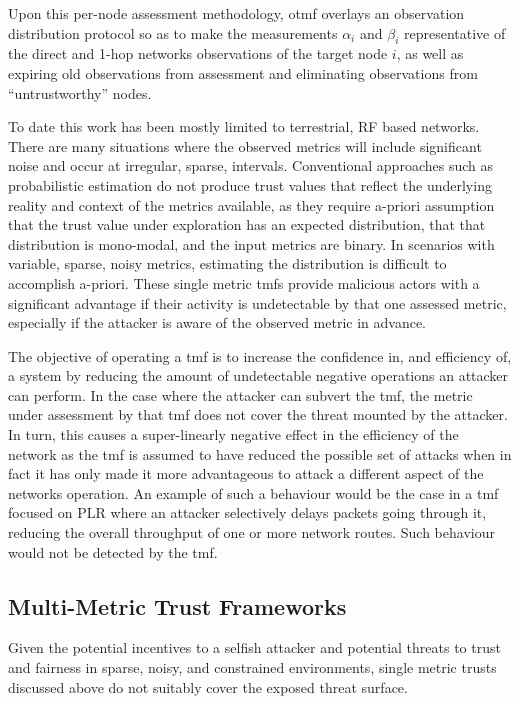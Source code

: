 Upon this per-node assessment methodology, \gls{otmf} overlays an observation distribution protocol so as to make the measurements $\alpha_i$ and $\beta_i$ representative of the direct and 1-hop networks observations of the target node $i$, as well as expiring old observations from assessment and eliminating observations from ``untrustworthy'' nodes.



To date this work has been mostly limited to terrestrial, RF based networks.
There are many situations where the observed metrics will include significant noise and occur at irregular, sparse, intervals.
Conventional approaches such as probabilistic estimation do not produce trust values that reflect the underlying reality and context of the metrics available, as they require a-priori assumption that the trust value under exploration has an expected distribution, that that distribution is mono-modal, and the input metrics are binary.
In scenarios with variable, sparse, noisy metrics, estimating the distribution is difficult to accomplish a-priori.
These single metric \glspl{tmf} provide malicious actors with a significant advantage if their activity is undetectable by that one assessed metric, especially if the attacker is aware of the observed metric in advance.

The objective of operating a \gls{tmf} is to increase the confidence in, and efficiency of, a system by reducing the amount of undetectable negative operations an attacker can perform.
In the case where the attacker can subvert the \gls{tmf}, the metric under assessment by that \gls{tmf} does not cover the threat mounted by the attacker.
In turn, this causes a super-linearly negative effect in the efficiency of the network as the \gls{tmf} is assumed to have reduced the possible set of attacks when in fact it has only made it more advantageous to attack a different aspect of the networks operation.
An example of such a behaviour would be the case in a \gls{tmf} focused on PLR where an attacker selectively delays packets going through it, reducing the overall throughput of one or more network routes.
Such behaviour would not be detected by the \gls{tmf}.

\subsection{Multi-Metric Trust Frameworks}\label{sec:multimetrictrust}
Given the potential incentives to a selfish attacker and potential threats to trust and fairness in sparse, noisy, and constrained environments, single metric trusts discussed above do not suitably cover the exposed threat surface.


